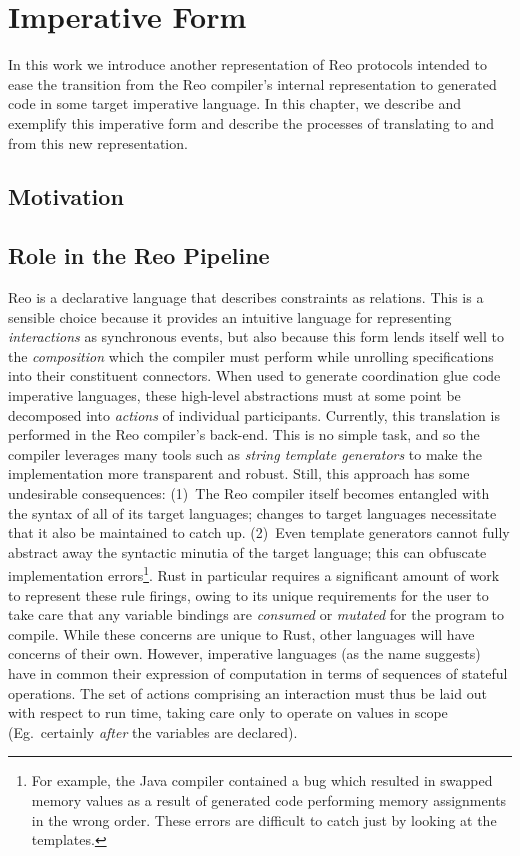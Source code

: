\chapter{Imperative Form}
In this work we introduce another representation of Reo protocols intended to ease the transition from the Reo compiler's internal representation to generated code in some target imperative language. In this chapter, we describe and exemplify this imperative form and describe the processes of translating to and from this new representation. 


\section{Motivation}

\section{Role in the Reo Pipeline}
Reo is a declarative language that describes constraints as relations. This is a sensible choice because it provides an intuitive language for representing \textit{interactions} as synchronous events, but also because this form lends itself well to the \textit{composition} which the compiler must perform while unrolling specifications into their constituent connectors. When used to generate coordination glue code imperative languages, these high-level abstractions must at some point be decomposed into \textit{actions} of individual participants. Currently, this translation is performed in the Reo compiler's back-end. This is no simple task, and so the compiler leverages many tools such as \textit{string template generators} to make the implementation more transparent and robust. Still, this approach has some undesirable consequences: (1)~The Reo compiler itself becomes entangled with the syntax of all of its target languages; changes to target languages necessitate that it also be maintained to catch up. (2)~Even template generators cannot fully abstract away the syntactic minutia of the target language; this can obfuscate implementation errors\footnote{For example, the Java compiler contained a bug which resulted in swapped memory values as a result of generated code performing memory assignments in the wrong order. These errors are difficult to catch just by looking at the templates.}. Rust in particular requires a significant amount of work to represent these rule firings, owing to its unique requirements for the user to take care that any variable bindings are \textit{consumed} or \textit{mutated} for the program to compile. While these concerns are unique to Rust, other languages will have concerns of their own. However, imperative languages (as the name suggests) have in common their expression of computation in terms of sequences of stateful operations. The set of actions comprising an interaction must thus be laid out with respect to run time, taking care only to operate on values in scope (Eg.\ certainly \textit{after} the variables are declared). 

